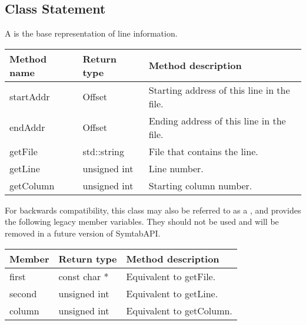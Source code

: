 \subsection{Class Statement}\label{Statement}

A  is the base representation of line information. 

\begin{tabular}{|l|l|l|}
	\hline
	Method name & Return type & Method description \\
	\hline
	startAddr & Offset & Starting address of this line in the file. \\
	endAddr & Offset & Ending address of this line in the file. \\
	getFile & std::string & File that contains the line.   \\
	getLine & unsigned int & Line number. \\
	getColumn & unsigned int & Starting column number. \\
	\hline
\end{tabular}

For backwards compatibility, this class may also be referred to as a , and provides the following legacy member variables. They should not be used and will be removed in a future version of SymtabAPI. 

\begin{tabular}{|l|l|l|}
	\hline
	Member & Return type & Method description \\
	\hline
	first & const char * & Equivalent to getFile. \\
	second & unsigned int & Equivalent to getLine. \\
	column & unsigned int & Equivalent to getColumn. \\ 
\hline
\end{tabular}
